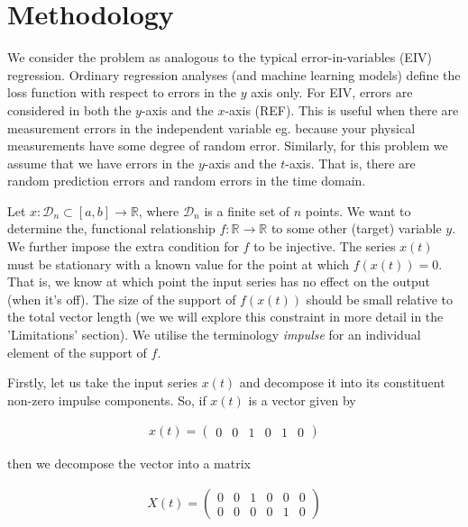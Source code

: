 \documentclass[11pt]{amsart}
\begin{document}
\section{Methodology}

We consider the problem as analogous to the typical error-in-variables (EIV) regression. Ordinary regression analyses (and machine learning models) define the loss function with respect to errors in the $y$ axis only. For EIV, errors are considered in both the $y$-axis and the $x$-axis (REF). This is useful when there are measurement errors in the independent variable eg. because your physical measurements have some degree of random error. Similarly, for this problem we assume that we have errors in the $y$-axis and the $t$-axis. That is, there are random prediction errors and random errors in the time domain. 

Let $x: \mathcal{D}_n\subset [a, b] \longrightarrow \mathbb{R}$, where $\mathcal{D}_n$ is a finite set of $n$ points. We want to determine the, functional relationship $f:\mathbb{R} \longrightarrow \mathbb{R}$ to some other (target) variable $y$. We further impose the extra condition for $f$ to be injective.  The series $x(t)$ must be stationary with a known value for the point at which $f(x(t)) = 0$.  That is, we know at which point the input series has no effect on the output (when it’s off). The size of the support of $f(x(t))$ should be small relative to the total vector length (we we will explore this constraint in more detail in the 'Limitations' section). We utilise the terminology {\em impulse} for an individual element of the support of $f$.



Firstly, let us take the input series $x(t)$ and decompose it into its constituent non-zero impulse components. So, if $x(t)$ is a vector given by 

\begin{align}
x(t) = 
\left(
\begin{array}{cccccc}
0 & 0 & 1 & 0 & 1 & 0
\end{array}  
\right)
\end{align}

then we decompose the vector into a matrix 

\begin{align}
X(t) = 
\left(
\begin{array}{cccccc}
0 & 0 & 1 & 0 & 0 & 0 \\
0 & 0 & 0 & 0 & 1 & 0 
\end{array}  
\right)
\end{align}
\end{document}
